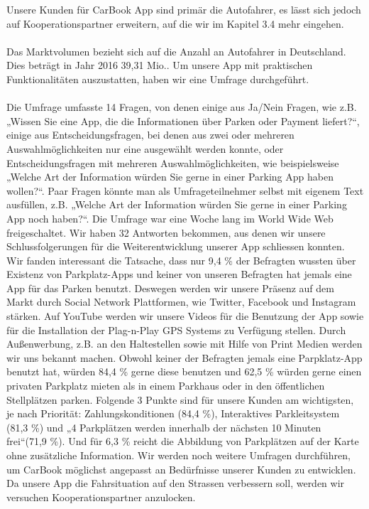 \documentclass[12pt,ngerman, fleqn]{book} %
\begin{document}
Unsere Kunden für CarBook App sind primär die Autofahrer, es lässt sich jedoch auf Kooperationspartner erweitern, auf die wir im Kapitel 3.4 mehr eingehen.\\ \\
Das Marktvolumen bezieht sich auf die Anzahl an Autofahrer in Deutschland. Dies beträgt in Jahr 2016 39,31 Mio.\autocite{statista3}.
Um unsere App mit praktischen Funktionalitäten auszustatten, haben wir eine Umfrage \autocite{umfrage} durchgeführt. \\ \\
Die Umfrage umfasste 14 Fragen, von denen einige aus Ja/Nein Fragen, wie z.B. „Wissen Sie eine App, die die Informationen über Parken oder Payment liefert?“, einige aus Entscheidungsfragen, bei denen aus zwei oder mehreren Auswahlmöglichkeiten nur eine ausgewählt werden konnte, oder Entscheidungsfragen mit mehreren Auswahlmöglichkeiten, wie beispielsweise „Welche Art der Information würden Sie gerne in einer Parking App haben wollen?“.  Paar Fragen könnte man als Umfrageteilnehmer selbst mit eigenem Text ausfüllen, z.B. „Welche Art der Information würden Sie gerne in einer Parking App noch haben?“. Die Umfrage war eine Woche lang im World Wide Web freigeschaltet. Wir haben 32 Antworten bekommen, aus denen wir unsere Schlussfolgerungen für die Weiterentwicklung unserer App schliessen konnten. Wir fanden interessant die Tatsache, dass nur 9,4 \% der Befragten wussten über Existenz von Parkplatz-Apps und keiner von unseren Befragten hat jemals eine App für das Parken benutzt.  Deswegen werden wir unsere Präsenz auf dem Markt durch Social Network Plattformen, wie Twitter, Facebook und Instagram stärken.  Auf YouTube werden wir unsere Videos für die Benutzung der App sowie für die Installation der Plag-n-Play GPS Systems zu Verfügung stellen. Durch Außenwerbung, z.B. an den Haltestellen sowie mit Hilfe von Print Medien werden wir uns bekannt machen. Obwohl keiner der Befragten jemals eine Parpklatz-App benutzt hat, würden 84,4 \% gerne diese benutzen und 62,5 \% würden gerne einen privaten Parkplatz mieten als in einem Parkhaus oder in den öffentlichen Stellplätzen parken. Folgende 3 Punkte sind für unsere Kunden am wichtigsten, je nach Priorität: Zahlungskonditionen (84,4 \%), Interaktives Parkleitsystem (81,3 \%) und „4 Parkplätzen werden innerhalb der nächsten 10 Minuten frei“(71,9 \%). Und für 6,3 \% reicht die Abbildung von Parkplätzen auf der Karte ohne zusätzliche Information. Wir werden noch weitere Umfragen durchführen, um CarBook möglichst angepasst an Bedürfnisse unserer Kunden zu entwicklen. Da unsere App die Fahrsituation auf den Strassen verbessern soll, werden wir versuchen Kooperationspartner anzulocken.
\end{document}
